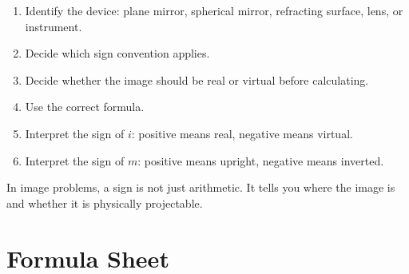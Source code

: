 \documentclass{studentnotes}
\begin{document}
\begin{enumerate}
    \item Identify the device: plane mirror, spherical mirror, refracting
    surface, lens, or instrument.
    \item Decide which sign convention applies.
    \item Decide whether the image should be real or virtual before calculating.
    \item Use the correct formula.
    \item Interpret the sign of \(i\): positive means real, negative means
    virtual.
    \item Interpret the sign of \(m\): positive means upright, negative means
    inverted.
\end{enumerate}

\begin{importantnote}
    In image problems, a sign is not just arithmetic. It tells you where the
    image is and whether it is physically projectable.
\end{importantnote}

\section{Formula Sheet}
\end{document}
